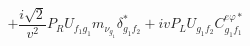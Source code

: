 %
\begin{dmath*}
%
  +  \frac{i \sqrt{2}}{v^2}P_R U_{f_1 g_1} m_{\nu_{g_1}} \delta_{g_1 f_2}^*  +  i vP_L U_{g_1 f_2} C^{e \varphi  *}_{g_1 f_1}
%
\end{dmath*}
%
